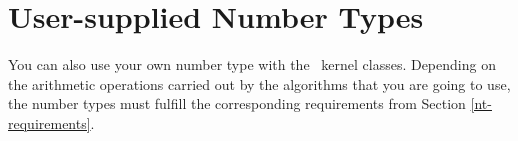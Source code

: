 \section{User-supplied Number Types}

You can also use your own number type with the \cgal\ kernel classes.
Depending on the arithmetic operations carried out by the algorithms
that you are going to use, the number types must fulfill the
corresponding requirements from Section \ref{nt-requirements}. 

